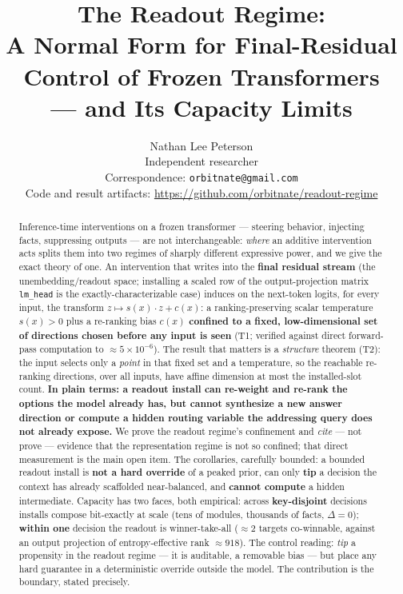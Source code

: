 \documentclass[11pt]{article}
\title{\bfseries The Readout Regime:\\ A Normal Form for Final-Residual Control of Frozen Transformers\\ --- and Its Capacity Limits}
\author{Nathan Lee Peterson\\[2pt]
  \normalsize Independent researcher\\
  \normalsize Correspondence: \texttt{orbitnate@gmail.com}\\
  \normalsize Code and result artifacts: \url{https://github.com/orbitnate/readout-regime}}
\date{}
\theoremstyle{plain}
\theoremstyle{definition}
\begin{document}
\maketitle


\begin{abstract}
Inference-time interventions on a frozen transformer --- steering behavior, injecting facts, suppressing outputs --- are not interchangeable: \emph{where} an additive intervention acts splits them into two regimes of sharply different expressive power, and we give the exact theory of one. An intervention that writes into the \textbf{final residual stream} (the unembedding/readout space; installing a scaled row of the output-projection matrix \texttt{lm\_head} is the exactly-characterizable case) induces on the next-token logits, for every input, the transform $z \mapsto s(x)\cdot z + c(x)$: a ranking-preserving scalar temperature $s(x) > 0$ plus a re-ranking bias $c(x)$ \textbf{confined to a fixed, low-dimensional set of directions chosen before any input is seen} (T1; verified against direct forward-pass computation to $\approx 5\times10^{-6}$). The result that matters is a \emph{structure} theorem (T2): the input selects only a \emph{point} in that fixed set and a temperature, so the reachable re-ranking directions, over all inputs, have affine dimension at most the installed-slot count. \textbf{In plain terms: a readout install can re-weight and re-rank the options the model already has, but cannot synthesize a new answer direction or compute a hidden routing variable the addressing query does not already expose.} We prove the readout regime's confinement and \emph{cite} --- not prove --- evidence that the representation regime is not so confined; that direct measurement is the main open item. The corollaries, carefully bounded: a bounded readout install is \textbf{not a hard override} of a peaked prior, can only \textbf{tip} a decision the context has already scaffolded near-balanced, and \textbf{cannot compute} a hidden intermediate. Capacity has two faces, both empirical: across \textbf{key-disjoint} decisions installs compose bit-exactly at scale (tens of modules, thousands of facts, $\Delta=0$); \textbf{within one} decision the readout is winner-take-all ($\approx 2$ targets co-winnable, against an output projection of entropy-effective rank $\approx 918$). The control reading: \emph{tip} a propensity in the readout regime --- it is auditable, a removable bias --- but place any hard guarantee in a deterministic override outside the model. The contribution is the boundary, stated precisely.
\end{abstract}
\end{document}
